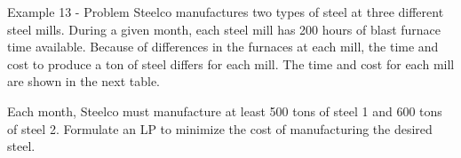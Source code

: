 \begin{frame}{Example 13 - Problem}
Steelco manufactures two types of steel at three different steel mills. During 
a given month, each steel mill has 200 hours of blast furnace time available. 
Because of differences in the furnaces at each mill, the time and cost to 
produce a ton of steel differs for each mill. The time and cost for each mill 
are shown in the next table. 


Each month, Steelco must manufacture at least 500 tons of steel 1 and 600 tons 
of steel 2. Formulate an LP to minimize the cost of manufacturing the desired 
steel.

\end{frame}
